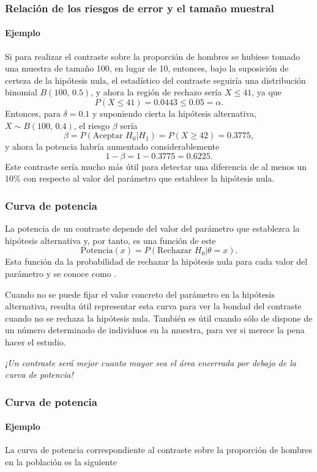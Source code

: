 \begin{frame}
\frametitle{Relación de los riesgos de error y el tamaño muestral}
\framesubtitle{Ejemplo}
Si para realizar el contraste sobre la proporción de hombres se hubiese tomado una muestra de tamaño 100, en lugar de 10, entonces, bajo la suposición de certeza de la hipótesis nula, el estadístico del contraste seguiría una distribución binomial $B(100,\,0.5)$, y ahora la región de rechazo sería $X\leq 41$, ya que
\[
P(X\leq 41) = 0.0443 \leq 0.05 =\alpha.
\]
Entonces, para $\delta=0.1$ y suponiendo cierta la hipótesis alternativa, $X\sim B(100,\,0.4)$, el riesgo $\beta$ sería
\[
\beta = P(\text{Aceptar }H_0|H_1) = P(X\geq 42) = 0.3775,
\]
y ahora la potencia habría aumentado considerablemente
\[
1-\beta = 1-0.3775 = 0.6225.
\]
Este contraste sería mucho más útil para detectar una diferencia de al menos un 10\% con respecto al valor del parámetro que establece la hipótesis nula.
\end{frame}


\begin{frame}
\frametitle{Curva de potencia}
La potencia de un contraste depende del valor del parámetro que establezca la hipótesis alternativa y, por tanto, es una función de este
\[
\text{Potencia}(x)= P(\text{Rechazar }H_0|\theta=x).
\]
Esta función da la probabilidad de rechazar la hipótesis nula para cada valor del parámetro y se conoce como .

Cuando no se puede fijar el valor concreto del parámetro en la hipótesis alternativa, resulta útil representar esta curva para ver la bondad del contraste cuando no se rechaza la hipótesis nula. También es útil cuando sólo de dispone de un número determinado de individuos en la muestra, para ver si merece la pena hacer el estudio.
\begin{center}
\alert{\emph{¡Un contraste será mejor cuanto mayor sea el área encerrada por debajo de la curva de potencia!}}
\end{center}
\end{frame}


\begin{frame}
\frametitle{Curva de potencia}
\framesubtitle{Ejemplo}
La curva de potencia correspondiente al contraste sobre la proporción de hombres en la población es la siguiente
\begin{center}
\scalebox{0.8}{}
\end{center}
\end{frame}



